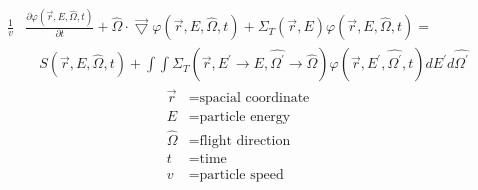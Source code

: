 \begin{equation}
  \begin{split}
    \frac{1}{v}&\frac{\partial \varphi(\vec{r},E,\hat{\Omega},t)}{\partial t} +
    \hat{\Omega} \cdot \vec{\bigtriangledown} \varphi(\vec{r},E,\hat{\Omega},t)
    + \Sigma_T(\vec{r},E) \varphi(\vec{r},E,\hat{\Omega},t) = \\
    & \quad S(\vec{r},E,\hat{\Omega},t) +
    \int\int \Sigma_T(\vec{r},E^{'} \to E,\hat{\Omega^{'}} \to \hat{\Omega})
    \varphi(\vec{r},E^{'},\hat{\Omega^{'}},t) dE^{'}d\hat{\Omega^{'}} 
  \end{split}
  \label{eq:integro_diff_boltzmann_eqn}
\end{equation}
\begin{align}
  \vec{r} & = \text{spacial coordinate} \nonumber \\
  E & = \text{particle energy} \nonumber \\
  \hat{\Omega} & = \text{flight direction} \nonumber \\
  t & = \text{time} \nonumber \\
  v & = \text{particle speed} \nonumber \\
\end{align}


